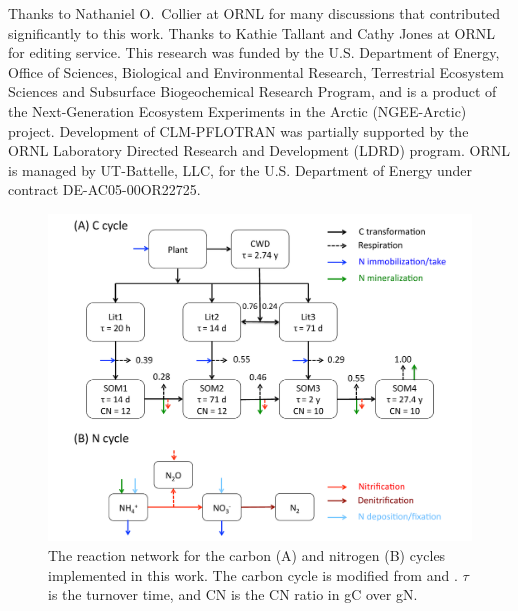 \documentclass[gmd, manuscript]{copernicus}
\begin{document}
\begin{acknowledgements}
Thanks to Nathaniel O.\ Collier at ORNL for many discussions that contributed
significantly to this work.
Thanks to Kathie Tallant and Cathy Jones at ORNL for editing service. This
research was funded by the U.S. Department of Energy, Office of Sciences,
Biological and Environmental Research, Terrestrial Ecosystem Sciences and
Subsurface Biogeochemical Research Program, and is a product of the
Next-Generation Ecosystem Experiments in the Arctic (NGEE-Arctic) project. 
Development of CLM-PFLOTRAN was partially supported by the ORNL 
Laboratory Directed Research and Development (LDRD) program.
ORNL is managed by UT-Battelle, LLC, for the U.S. Department of Energy under
contract DE-AC05-00OR22725.
\end{acknowledgements}











%

\clearpage
\begin{figure}[t]
\includegraphics[width=15cm]{../figs/fig01/fig01conceptualmodel.pdf}
\caption{The reaction network for the carbon (A) and nitrogen (B) cycles
implemented in this work. The carbon cycle is modified from
\citet{Thornton2005} and \citet{Bonan2012}. $\tau$ is the turnover time, and CN
is the CN ratio in gC over gN.}
\label{fig:conceptualmodel}
\end{figure}
\end{document}
